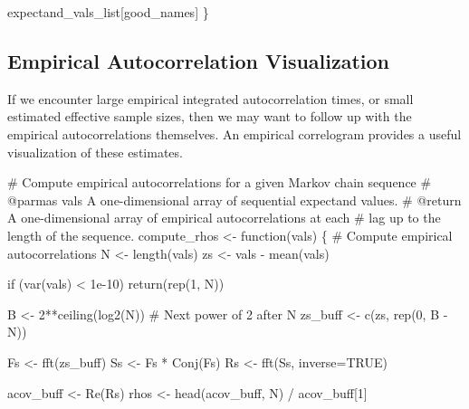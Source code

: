 \documentclass[
  letterpaper,
  DIV=11,
  numbers=noendperiod]{scrartcl}
\newenvironment{Shaded}{\begin{snugshade}}{\end{snugshade}}
\newcommand{\CommentTok}[1]{\textcolor[rgb]{0.37,0.37,0.37}{#1}}
\newcommand{\ControlFlowTok}[1]{\textcolor[rgb]{0.00,0.23,0.31}{#1}}
\newcommand{\DecValTok}[1]{\textcolor[rgb]{0.68,0.00,0.00}{#1}}
\newcommand{\FloatTok}[1]{\textcolor[rgb]{0.68,0.00,0.00}{#1}}
\newcommand{\NormalTok}[1]{\textcolor[rgb]{0.00,0.23,0.31}{#1}}
\newcommand{\OperatorTok}[1]{\textcolor[rgb]{0.37,0.37,0.37}{#1}}
\begin{document}
\begin{Shaded}
\begin{Highlighting}[]
\NormalTok{  expectand\_vals\_list[good\_names]}
\NormalTok{\}}
\end{Highlighting}
\end{Shaded}

\subsection{Empirical Autocorrelation
Visualization}\label{empirical-autocorrelation-visualization}

If we encounter large empirical integrated autocorrelation times, or
small estimated effective sample sizes, then we may want to follow up
with the empirical autocorrelations themselves. An empirical correlogram
provides a useful visualization of these estimates.

\begin{Shaded}
\begin{Highlighting}[]
\CommentTok{\# Compute empirical autocorrelations for a given Markov chain sequence}
\CommentTok{\# @parmas vals A one{-}dimensional array of sequential expectand values.}
\CommentTok{\# @return A one{-}dimensional array of empirical autocorrelations at each}
\CommentTok{\#         lag up to the length of the sequence.}
\NormalTok{compute\_rhos }\OperatorTok{\textless{}{-}}\NormalTok{ function(vals) \{}
  \CommentTok{\# Compute empirical autocorrelations}
\NormalTok{  N }\OperatorTok{\textless{}{-}}\NormalTok{ length(vals)}
\NormalTok{  zs }\OperatorTok{\textless{}{-}}\NormalTok{ vals }\OperatorTok{{-}}\NormalTok{ mean(vals)}
  
  \ControlFlowTok{if}\NormalTok{ (var(vals) }\OperatorTok{\textless{}} \FloatTok{1e{-}10}\NormalTok{)}
    \ControlFlowTok{return}\NormalTok{(rep(}\DecValTok{1}\NormalTok{, N))}

\NormalTok{  B }\OperatorTok{\textless{}{-}} \DecValTok{2}\OperatorTok{**}\NormalTok{ceiling(log2(N)) }\CommentTok{\# Next power of 2 after N}
\NormalTok{  zs\_buff }\OperatorTok{\textless{}{-}}\NormalTok{ c(zs, rep(}\DecValTok{0}\NormalTok{, B }\OperatorTok{{-}}\NormalTok{ N))}

\NormalTok{  Fs }\OperatorTok{\textless{}{-}}\NormalTok{ fft(zs\_buff)}
\NormalTok{  Ss }\OperatorTok{\textless{}{-}}\NormalTok{ Fs }\OperatorTok{*}\NormalTok{ Conj(Fs)}
\NormalTok{  Rs }\OperatorTok{\textless{}{-}}\NormalTok{ fft(Ss, inverse}\OperatorTok{=}\NormalTok{TRUE)}

\NormalTok{  acov\_buff }\OperatorTok{\textless{}{-}}\NormalTok{ Re(Rs)}
\NormalTok{  rhos }\OperatorTok{\textless{}{-}}\NormalTok{ head(acov\_buff, N) }\OperatorTok{/}\NormalTok{ acov\_buff[}\DecValTok{1}\NormalTok{]}


\end{Highlighting}
\end{Shaded}
\end{document}
